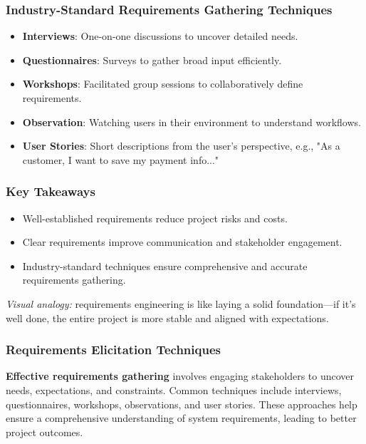 \documentclass{beamer}
\begin{document}
\begin{frame}[fragile]
  \frametitle{Industry-Standard Requirements Gathering Techniques}
  \begin{itemize}
    \item \textbf{Interviews}: One-on-one discussions to uncover detailed needs.
    \item \textbf{Questionnaires}: Surveys to gather broad input efficiently.
    \item \textbf{Workshops}: Facilitated group sessions to collaboratively define requirements.
    \item \textbf{Observation}: Watching users in their environment to understand workflows.
    \item \textbf{User Stories}: Short descriptions from the user's perspective, e.g., "As a customer, I want to save my payment info..."
  \end{itemize}
\end{frame}

\begin{frame}[fragile]
  \frametitle{Key Takeaways}
  \begin{itemize}
    \item Well-established requirements reduce project risks and costs.
    \item Clear requirements improve communication and stakeholder engagement.
    \item Industry-standard techniques ensure comprehensive and accurate requirements gathering.
  \end{itemize}
  \vspace{0.5cm}
  \textit{Visual analogy:} requirements engineering is like laying a solid foundation—if it's well done, the entire project is more stable and aligned with expectations.
\end{frame}

\begin{frame}[fragile]
  \frametitle{Requirements Elicitation Techniques}
  \textbf{Effective requirements gathering} involves engaging stakeholders to uncover needs, expectations, and constraints. Common techniques include interviews, questionnaires, workshops, observations, and user stories. These approaches help ensure a comprehensive understanding of system requirements, leading to better project outcomes.
\end{frame}
\end{document}
